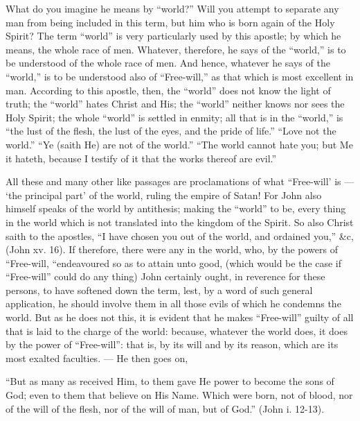 What do you imagine he means by “world?” Will you attempt to separate any man from being included in this term, but him who is born again of the Holy Spirit? The term “world” is very particularly used by this apostle; by which he means, the whole race of men. Whatever, therefore, he says of the “world,” is to be understood of the whole race of men. And hence, whatever he says of the “world,” is to be understood also of “Free-will,” as that which is most excellent in man. According to this apostle, then, the “world” does not know the light of truth; the “world” hates Christ and His; the “world” neither knows nor sees the Holy Spirit; the whole “world” is settled in enmity; all that is in the “world,” is “the lust of the flesh, the lust of the eyes, and the pride of life.” “Love not the world.” “Ye (saith He) are not of the world.” “The world cannot hate you; but Me it hateth, because I testify of it that the works thereof are evil.”

All these and many other like passages are proclamations of what “Free-will’ is — ‘the principal part’ of the world, ruling the empire of Satan! For John also himself speaks of the world by antithesis; making the “world” to be, every thing in the world which is not translated into the kingdom of the Spirit. So also Christ saith to the apostles, “I have chosen you out of the world, and ordained you,” \&c, (John xv. 16). If therefore, there were any in the world, who, by the powers of “Free-will, “endeavoured so as to attain unto good, (which would be the case if “Free-will” could do any thing) John certainly ought, in reverence for these persons, to have softened down the term, lest, by a word of such general application, he should involve them in all those evils of which he condemns the world. But as he does not this, it is evident that he makes “Free-will” guilty of all that is laid to the charge of the world: because, whatever the world does, it does by the power of “Free-will”: that is, by its will and by its reason, which are its most exalted faculties. — He then goes on,

“But as many as received Him, to them gave He power to become the sons of God; even to them that believe on His Name. Which were born, not of blood, nor of the will of the flesh, nor of the will of man, but of God.” (John i. 12-13).

